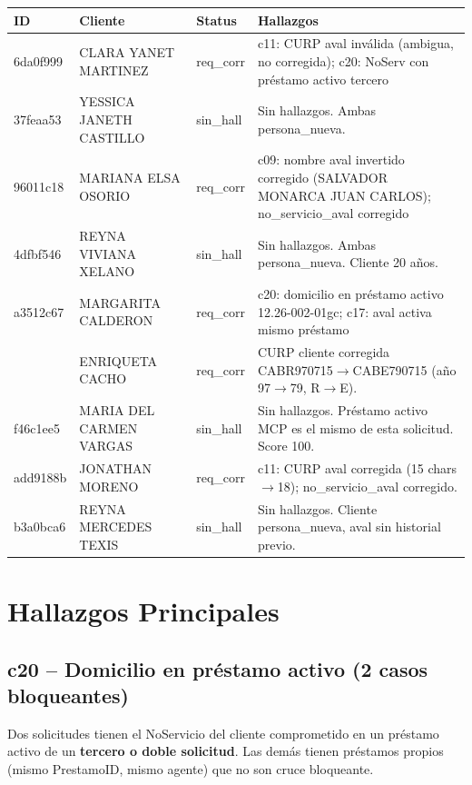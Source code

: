 \documentclass[11pt,a4paper]{article}
\begin{document}
\begin{longtable}{@{}p{3.2cm}p{3.8cm}p{1.4cm}p{6.5cm}@{}}
\toprule
\textbf{ID} & \textbf{Cliente} & \textbf{Status} & \textbf{Hallazgos} \\
\midrule
\endhead
6da0f999 & CLARA YANET MARTINEZ & \textcolor{rojo}{req\_corr} & c11: CURP aval inv\'alida (ambigua, no corregida); c20: NoServ con pr\'estamo activo tercero \\
\addlinespace
37feaa53 & YESSICA JANETH CASTILLO & \textcolor{verde}{sin\_hall} & Sin hallazgos. Ambas persona\_nueva. \\
\addlinespace
96011c18 & MARIANA ELSA OSORIO & \textcolor{rojo}{req\_corr} & c09: nombre aval invertido corregido (SALVADOR MONARCA JUAN CARLOS); no\_servicio\_aval corregido \\
\addlinespace
4dfbf546 & REYNA VIVIANA XELANO & \textcolor{verde}{sin\_hall} & Sin hallazgos. Ambas persona\_nueva. Cliente 20 a\~nos. \\
\addlinespace
a3512c67 & MARGARITA CALDERON & \textcolor{rojo}{req\_corr} & c20: domicilio en pr\'estamo activo 12.26-002-01gc; c17: aval activa mismo pr\'estamo \\
\addlinespace
64127174 & ENRIQUETA CACHO & \textcolor{rojo}{req\_corr} & CURP cliente corregida CABR970715$\to$CABE790715 (a\~no 97$\to$79, R$\to$E). \\
\addlinespace
f46c1ee5 & MARIA DEL CARMEN VARGAS & \textcolor{verde}{sin\_hall} & Sin hallazgos. Pr\'estamo activo MCP es el mismo de esta solicitud. Score 100. \\
\addlinespace
add9188b & JONATHAN MORENO & \textcolor{rojo}{req\_corr} & c11: CURP aval corregida (15 chars$\to$18); no\_servicio\_aval corregido. \\
\addlinespace
b3a0bca6 & REYNA MERCEDES TEXIS & \textcolor{verde}{sin\_hall} & Sin hallazgos. Cliente persona\_nueva, aval sin historial previo. \\
\bottomrule
\end{longtable}

\section{Hallazgos Principales}

\subsection{c20 -- Domicilio en pr\'estamo activo (2 casos bloqueantes)}

Dos solicitudes tienen el NoServicio del cliente comprometido en un pr\'estamo activo
de un \textbf{tercero o doble solicitud}. Las dem\'as tienen pr\'estamos propios
(mismo PrestamoID, mismo agente) que no son cruce bloqueante.
\end{document}
